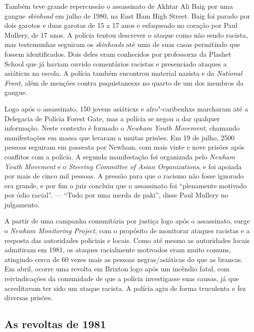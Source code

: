 Também teve grande repercussão o assassinato de Akhtar Ali Baig por uma gangue \emph{skinhead} em julho de 1980, na East Ham High Street. Baig foi parado por dois garotos e duas garotas de 15 a 17 anos e esfaqueado no coração por Paul Mullery, de 17 anos. A polícia tentou descrever o ataque como não sendo racista, mas testemunhas seguiram os \emph{skinheads} até uma de suas casas permitindo que fossem identificados. Dois deles eram conhecidos por professorxs da Plashet School que já haviam ouvido comentários racistas e presenciado ataques a asiáticxs na escola. A polícia também encontrou material nazista e da \emph{National Front}, além de menções contra paquistanesxs no quarto de um dos membros da gangue.

Logo após o assassinato, 150 jovens asiáticxs e afro"-caribenhxs marcharam até a Delegacia de Polícia Forest Gate, mas a polícia se negou a dar qualquer informação. Neste contexto é formado o \emph{Newham Youth Movement}, chamando manifestações em massa que levaram a muitas prisões. Em 19 de julho, 2500 pessoas seguiram em passeata por Newham, com mais vinte e nove prisões após conflitos com a polícia. A segunda manifestação foi organizada pelo \emph{Newham Youth Movement} e o \emph{Steering Committee of Asian Organizations}, e foi apoiada por mais de cinco mil pessoas. A pressão para que o racismo não fosse ignorado era grande, e por fim o juiz concluiu que o assassinato foi ``plenamente motivado por ódio racial''. --- ``Tudo por uma merda de paki'', disse Paul Mullery no julgamento.

A partir de uma campanha comunitária por justiça logo após o assassinato, surge o \emph{Newham Monitoring Project}, com o propósito de monitorar ataques racistas e a resposta das autoridades policiais e locais. Como até mesmo as autoridades locais admitiram em 1981, os ataques racialmente motivados eram muito comuns, atingindo cerca de 60 vezes mais as pessoas negras/asiáticas do que as brancas. Em abril, ocorre uma revolta em Brixton logo após um incêndio fatal, com reivindicações da comunidade de que a polícia investigasse suas causas, já que acreditavam ter sido um ataque racista. A polícia agiu de forma truculenta e fez diversas prisões.


\subsection{As revoltas de 1981}

